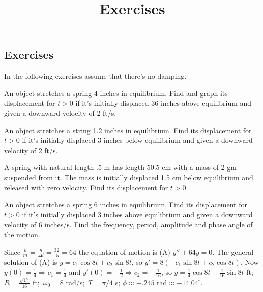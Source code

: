 \documentclass{ximera}
\title{Exercises} \license{CC BY-NC-SA 4.0}
\begin{document}
\begin{abstract}
\end{abstract}
\maketitle

\begin{onlineOnly}
\section*{Exercises}
\end{onlineOnly}

In the following exercises assume that there's no damping.

\begin{problem}\label{exer:6.1.1}
An object stretches a spring 4 inches in equilibrium.
Find and graph its displacement for $t>0$ if it's initially displaced
36 inches above equilibrium and given a downward velocity of 2 ft/s.
\end{problem}

\begin{problem}\label{exer:6.1.2}
An object  stretches a string 1.2 inches in equilibrium.
Find its displacement for $t>0$ if it's initially displaced 3 inches
below equilibrium and given a downward velocity of 2 ft/s.
\end{problem}

\begin{problem}\label{exer:6.1.3}
A spring with natural length .5 m has length 50.5 cm with a mass of 2
gm suspended from it. The mass is initially displaced 1.5 cm below
equilibrium and released with zero velocity. Find its displacement for
$t>0$.
\end{problem}

\begin{problem}\label{exer:6.1.4}
An object stretches a spring 6 inches in equilibrium. Find its
displacement for $t>0$ if it's initially displaced 3 inches above
equilibrium and given a downward velocity of 6 inches/s. Find the
frequency, period, amplitude and phase angle of the motion.

\begin{solution}
Since $\frac{k}{m}=\frac{g}{\Delta l}=\frac{32}{.5}=64$ the
equation of motion is (A) $y''+64y=0$. The general solution of (A) is
$y=c_1\cos8t+c_2\sin8t$, so $y'=8(-c_1\sin8t+c_2\cos8t)$. Now
$y(0)=\frac{1}{4}\Rightarrow c_1=\frac{1}{4}$ and
$y'(0)=-\frac{1}{2}\Rightarrow c_2=-\frac{1}{16}$, so
$y=\frac{1}{4}\cos8t-\frac{1}{16}\sin8t$ ft;\;
$R=\frac{\sqrt{17}}{16}$ ft;\ $\omega_0=8$ rad/s;\ $T=\pi/4$ s;
$\phi\approx-.245\text{ rad}\approx -14.04^\circ$.

\end{solution}
\end{problem}
\end{document}
